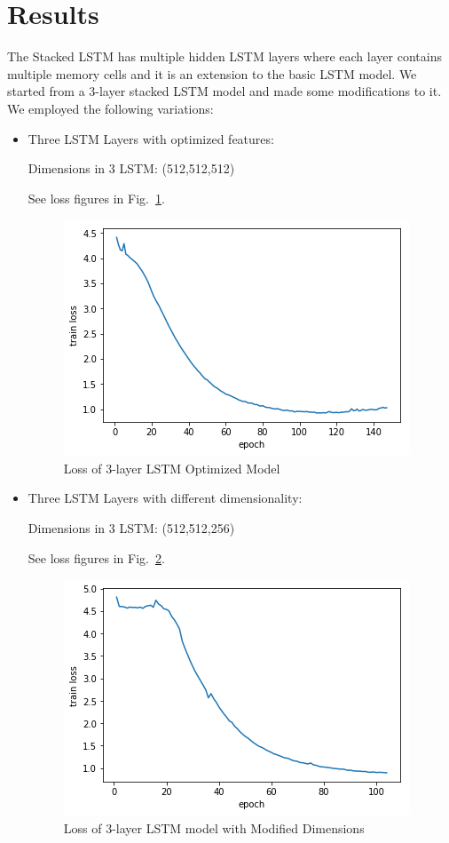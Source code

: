 \documentclass[conference]{IEEEtran}
\begin{document}
\section{Results}
The Stacked LSTM has multiple hidden LSTM layers where each layer contains multiple memory cells and it is an extension to the basic LSTM model. We started from a 3-layer stacked LSTM model and made some modifications to it. We employed the following variations: 
\begin{itemize}

\item Three LSTM Layers with optimized features: 

Dimensions in 3 LSTM: (512,512,512)

See loss figures in Fig.~\ref{fig1}.

\begin{figure}[htbp]
\centerline{\includegraphics[scale=0.6]{pics/loss_optimal.png}}
\caption{Loss of 3-layer LSTM Optimized Model}
\label{fig1}
\end{figure}

\item Three LSTM Layers with different dimensionality:  

Dimensions in 3 LSTM: (512,512,256)

See loss figures in Fig.~\ref{fig2}.

\begin{figure}[htbp]
\centerline{\includegraphics[scale=0.6]{pics/log_to256.png}}
\caption{Loss of 3-layer LSTM model with Modified Dimensions}
\label{fig2}
\end{figure}


\end{itemize}
\end{document}
